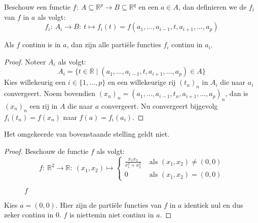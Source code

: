 \documentclass[main.tex]{subfiles}
\begin{document}
\begin{de}
  Beschouw een functie $f:\ A \subseteq \mathbb{R}^{p} \rightarrow B \subseteq \mathbb{R}^{q}$ en een $a\in A$, dan definieren we de  $f_{i}$ van $f$ in $a$ als volgt:
  \[ f_{i}:\ A_{i} \rightarrow B:\ t \mapsto f_{i}(t) = f(a_{1},\dotsc,a_{i-1},t,a_{i+1},\dotsc,a_{p}) \]
\end{de}

\begin{pr}
  Als $f$ continu is in $a$, dan zijn alle parti\"ele functies $f_{i}$ continu in $a_{i}$.

  \begin{proof}
    Noteer $A_{i}$ als volgt:
    \[ A_{i} = \{ t\in \mathbb{R} \mid (a_{1},\dotsc,a_{i-1},t,a_{i+1},\dotsc,a_{p}) \in A \} \]
    Kies willekeurig een $i\in \{1,\dotsc,p\}$ en een willekeurige rij $(t_{n})_{n}$ in $A_{i}$ die naar $a_{i}$ convergeert.
    Noem bovendien $(x_{n})_{n} = (a_{1},\dotsc,a_{i-1},t_{n},a_{i+1},\dotsc,a_{p})_{n}$, dan is $(x_{n})_{n}$ een rij in $A$ die naar $a$ convergeert.
    Nu convergeert bijgevolg $f_{i}(t_{n}) = f(x_{n})$ naar $f(a) = f_{i}(a_{i})$.
  \end{proof}
\end{pr}

\begin{tvb}
  Het omgekeerde van bovenstaande stelling geldt niet.
  
  \begin{proof}
    Beschouw de functie $f$ als volgt:
    \[ 
    f:\ \mathbb{R}^{2} \rightarrow \mathbb{R}:\ (x_{1},x_{2}) \mapsto 
    \begin{cases}
      \frac{x_{1}x_{2}}{x_{1}^{2}+x_{2}^{2}} & \text{ als } (x_{1},x_{2}) \neq (0,0)\\
      0 & \text{ als } (x_{1},x_{2}) = (0,0)
    \end{cases}
    \]
    \begin{figure}[H]
      \centering
      \caption{$f$}
    \end{figure}
    Kies $a=(0,0)$. Hier zijn de parti\"ele functies van $f$ in $a$ identiek nul en dus zeker continu in $0$.
    $f$ is niettemin niet continu in $a$.\waarom
  \end{proof}
\end{tvb}
\end{document}
